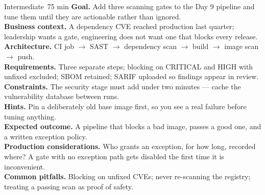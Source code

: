 \begin{minilab}{Intermediate}{~75 min}
\textbf{Goal.} Add three scanning gates to the Day 9 pipeline and tune them until they are actionable rather than ignored.\\
\textbf{Business context.} A dependency CVE reached production last quarter; leadership wants a gate, engineering does not want one that blocks every release.\\
\textbf{Architecture.} CI job $\rightarrow$ SAST $\rightarrow$ dependency scan $\rightarrow$ build $\rightarrow$ image scan $\rightarrow$ push.\\
\textbf{Requirements.} Three separate steps; blocking on CRITICAL and HIGH with unfixed excluded; SBOM retained; SARIF uploaded so findings appear in review.\\
\textbf{Constraints.} The security stage must add under two minutes --- cache the vulnerability database between runs.\\
\textbf{Hints.} Pin a deliberately old base image first, so you see a real failure before tuning anything.\\
\textbf{Expected outcome.} A pipeline that blocks a bad image, passes a good one, and a written exception policy.\\
\textbf{Production considerations.} Who grants an exception, for how long, recorded where? A gate with no exception path gets disabled the first time it is inconvenient.\\
\textbf{Common pitfalls.} Blocking on unfixed CVEs; never re-scanning the registry; treating a passing scan as proof of safety.
\end{minilab}

